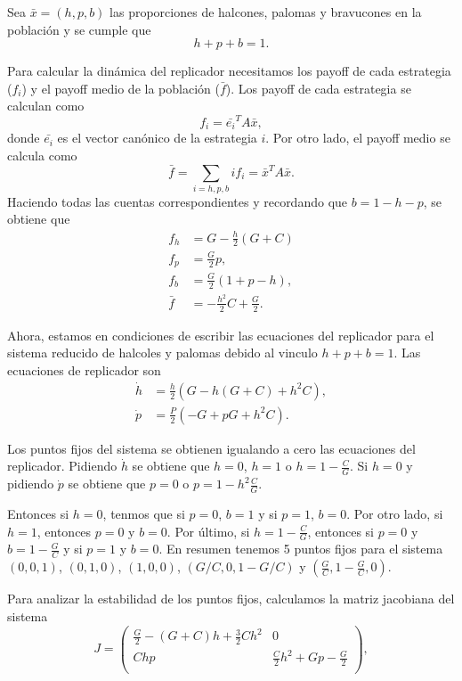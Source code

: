 \documentclass[letterpaper,12pt]{article}
\theoremstyle{plain}
\begin{document}
Sea $\bar{x} = (h,p,b)$ las proporciones de halcones, palomas y bravucones en la población y se cumple que 
\begin{equation}
    h + p + b = 1.
\end{equation}

Para calcular la dinámica del replicador necesitamos los payoff de cada estrategia ($f_i$) y el payoff medio de la población ($\bar{f}$). Los payoff de cada estrategia se calculan como
\begin{equation}
    f_i = \bar{e_i}^T  A  \bar{x},
\end{equation}
donde $\bar{e_i}$ es el vector canónico de la estrategia $i$. Por otro lado, el payoff medio se calcula como 
\begin{equation}
    \bar{f} = \sum_{i=h,p,b} i f_i = \bar{x}^T A \bar{x}.
\end{equation}
Haciendo todas las cuentas correspondientes y recordando que $b = 1 - h - p$, se obtiene que
\begin{align}
    f_h &= G - \frac{h}{2}(G+C) \\
    f_p &= \frac{G}{2} p, \\
    f_b &= \frac{G}{2} (1+p-h), \\
    \bar{f} &= -\frac{h^2}{2} C + \frac{G}{2}.
\end{align}

Ahora, estamos en condiciones de escribir las ecuaciones del replicador para el sistema reducido de halcoles y palomas debido al vinculo $h + p + b = 1$. Las ecuaciones de replicador son  
\begin{align}
    \dot{h} &= \frac{h}{2}(G - h(G+C) + h^2 C), \\
    \dot{p} &= \frac{P}{2}(-G + pG + h^2 C).
\end{align}

Los puntos fijos del sistema se obtienen igualando a cero las ecuaciones del replicador. Pidiendo $\dot{h}$ se obtiene que $h = 0$, $h=1$ o $h = 1 - \frac{C}{G}$. Si $h = 0$ y pidiendo $\dot{p}$ se obtiene que $p = 0$ o $p = 1- h^2\frac{C}{G}$.  

Entonces si $h=0$, tenmos que si $p = 0$, $b=1$ y si $p = 1$, $b = 0$. Por otro lado, si $h = 1$, entonces $p = 0$ y $b = 0$. Por último, si $h = 1 - \frac{C}{G}$, entonces si $p = 0$ y $b = 1 - \frac{G}{C}$ y si $p = 1$ y $b = 0$. En resumen tenemos 5 puntos fijos para el sistema $(0,0,1)$, $(0,1,0)$, $(1,0,0)$, $(G/C,0,1- G/C)$ y $(\frac{G}{C}, 1 - \frac{G}{C}, 0)$.

Para analizar la estabilidad de los puntos fijos, calculamos la matriz jacobiana del sistema 
\begin{equation}
    J =
\begin{pmatrix}
\frac{G}{2} - \left(G+C\right) h + \frac{3}{2}Ch^2  & 0 \\
Chp                                                 &  \frac{C}{2}h^2 + Gp - \frac{G}{2} \\
\end{pmatrix},
\end{equation}
\end{document}
